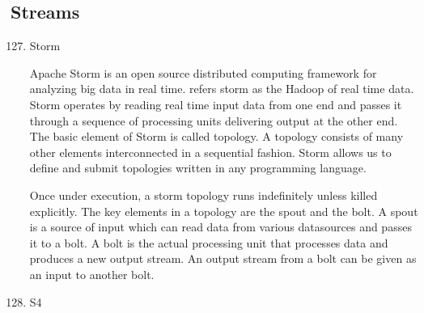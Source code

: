 \subsection{Streams}
\label{\detokenize{i524/technologies:streams}}\begin{enumerate}
\setcounter{enumi}{126}
\item {} 
Storm

Apache Storm is an open source distributed computing framework for
analyzing big data in real time. \label{\detokenize{i524/technologies:id257}}{\hyperref[\detokenize{i524/technologies:storm-paper-ijctt}]{\sphinxcrossref{{[}214{]}}}} refers
storm as the Hadoop of real time data. Storm operates by reading real
time input data from one end and passes it through a sequence of
processing units delivering output at the other end. The basic element
of Storm is called topology. A topology consists of many other
elements interconnected in a sequential fashion. Storm allows us to
define and submit topologies written in any programming language.

Once under execution, a storm topology runs indefinitely unless killed
explicitly. The key elements in a topology are the spout and the
bolt. A spout is a source of input which can read data from various
datasources and passes it to a bolt. A bolt is the actual processing
unit that processes data and produces a new output stream. An output
stream from a bolt can be given as an input to another
bolt. \label{\detokenize{i524/technologies:id258}}{\hyperref[\detokenize{i524/technologies:www-storm-home-concepts}]{\sphinxcrossref{{[}215{]}}}}

\item {} 
S4


\end{enumerate}
